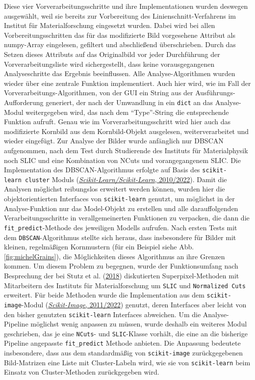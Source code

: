 \documentclass[
  12pt,
  openany]{book}
\begin{document}
Diese vier Vorverarbeitungsschritte und ihre Implementationen wurden deswegen ausgewählt, weil sie bereits zur Vorbereitung des Linienschnitt-Verfahrens im Institut für Materialforschung eingesetzt wurden. Dabei wird bei allen Vorbereitungsschritten das für das modifizierte Bild vorgesehene Attribut als numpy-Array eingelesen, gefiltert und abschließend überschrieben. Durch das Setzen dieses Attributs auf das Originalbild vor jeder Durchführung der Vorverarbeitungsliste wird sichergestellt, dass keine vorausgegangenen Analyseschritte das Ergebnis beeinflussen. \newline
Alle Analyse-Algorithmen wurden wieder über eine zentrale Funktion implementiert. Auch hier wird, wie im Fall der Vorverarbeitungs-Algorithmen, von der GUI ein String aus der Ausführungs-Aufforderung generiert, der nach der Umwandlung in ein \texttt{dict} an das Analyse-Modul weitergegeben wird, das nach dem ``Type''-String die entsprechende Funktion aufruft. Genau wie im Vorverarbeitungsschritt wird hier auch das modifizierte Kornbild aus dem Kornbild-Objekt ausgelesen, weiterverarbeitet und wieder eingefügt.
Zur Analyse der Bilder wurde anfänglich nur DBSCAN aufgenommen, nach dem Test durch Studierende des Instituts für Materialphysik noch SLIC und eine Kombination von NCuts und vorangegangenem SLIC.
Die Implementation des DBSCAN-Algorithmus erfolgte auf Basis des \texttt{scikit-learn\ cluster} Moduls (\protect\hyperlink{ref-ScikitlearnScikitlearn2022}{\emph{Scikit-Learn/Scikit-Learn}, 2010/2022}). Damit die Analysen möglichst reibungslos erweitert werden können, wurden hier die objektorientierten Interfaces von \texttt{scikit-learn} genutzt, um möglichst in der Analyse-Funktion nur das Model-Objekt zu erstellen und alle darauffolgenden Verarbeitungsschritte in verallgemeinerten Funktionen zu verpacken, die dann die \texttt{fit\_predict}-Methode des jeweiligen Modells aufrufen.
Nach ersten Tests mit dem \texttt{DBSCAN}-Algorithmus stellte sich heraus, dass insbesondere für Bilder mit kleinen, regelmäßigen Kornmustern (für ein Beispiel siehe Abb. \ref{fig:michelGrains}), die Möglichkeiten dieses Algorithmus an ihre Grenzen kommen. Um diesem Problem zu begegnen, wurde der Funktionsumfang nach Besprechung der bei Stutz et al. (\protect\hyperlink{ref-stutzSuperpixelsEvaluationStateoftheart2018}{2018}) diskutierten Superpixel-Methoden mit Mitarbeitern des Instituts für Materialforschung um \texttt{SLIC} und \texttt{Normalized\ Cuts} erweitert. Für beide Methoden wurde die Implementation aus dem \texttt{scikit-image}-Modul (\protect\hyperlink{ref-ScikitimageImageProcessing2022}{\emph{Scikit-Image}, 2011/2022}) genutzt, deren Interfaces aber leicht von den bisher genutzten \texttt{scikit-learn} Interfaces abweichen. Um die Analyse-Pipeline möglichst wenig anpassen zu müssen, wurde deshalb ein weiteres Modul geschrieben, das je eine \texttt{NCuts}- und \texttt{SLIC}-Klasse vorhält, die eine an die bisherige Pipeline angepasste \texttt{fit\_predict} Methode anbieten. Die Anpassung bedeutete insbesondere, dass aus dem standardmäßig von \texttt{scikit-image} zurückgegebenen Bild-Matrizen eine Liste mit Cluster-Labeln wird, wie sie von \texttt{scikit-learn} beim Einsatz von Cluster-Methoden zurückgegeben wird.
\end{document}
